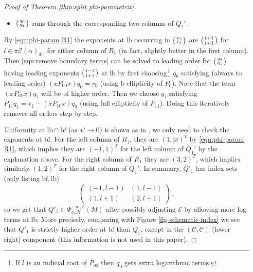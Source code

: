 \documentclass[JEP,XML,SOM,Unicode,NoFloatCountersInSection,published]{cedram}
\newenvironment{smallpmatrix}{\big(\begin{smallmatrix}}{\end{smallmatrix}\big)}
\theoremstyle{plain}
\theoremstyle{definition}
\newcommand\calE{{\mathcal E}}
\newcommand{\lf}{{\mathrm{lb}}}
\newcommand{\bbf}{{\mathrm{bf}}}
\begin{document}
\begin{proof}[Proof of Theorem \ref{thm:split phi-parametrix}]
\begin{itemize}
\item $\begin{smallpmatrix} q_0 \\ q_1 \end{smallpmatrix}$ runs through the corresponding two columns of $Q_1'$.
\end{itemize}
By \eqref{eqn:phi-param R1} the exponents at $\lf$ occurring in $\begin{smallpmatrix}
r_0 \\
r_1
\end{smallpmatrix}
$ are $\begin{smallpmatrix}
l+1 \\
l+1
\end{smallpmatrix}
$
for $l\in\pi\calE(\alpha)_\lf$, for either column of $R_1$ (in fact, slightly better in the first column). Then \eqref{eqn:remove boundary terms}
can be solved to leading order for $\begin{smallpmatrix}
q_0 \\
q_1
\end{smallpmatrix}
$ having leading exponents
$\begin{smallpmatrix}
l-1 \\
l+1
\end{smallpmatrix}
$
at $\lf$
by first choosing\footnote{If $l$ is an indicial root of $P_{00}$ then $q_0$ gets extra logarithmic terms.}~$q_0$ satisfying (always to leading order) $(xP_{00}x)q_0=r_0$ (using b-ellipticity of $P_{0}$).
Note that the term $(xP_{01}x)q_1$ will be of higher order. Then we choose $q_1$ satisfying
$P_{11} q_1 = r_1 - (xP_{10}x)q_0$ (using full ellipticity of $P_{11}$).
Doing this iteratively removes all orders step by step.

Uniformity at $\lf\cap\bbf$ (as $x'\to 0$) is shown as in \cite[Lem.\,5.44]{melrose1993atiyah}, we only need to check the exponents at $\bbf$. For the left column of $R_1$, they are $(1,\varnothing)^T$ by \eqref{eqn:phi-param R1}, which implies they are $(-1,1)^T$ for the left column of $Q_1'$ by the explanation above. For the right column of $R_1$ they are $(3,2)^T$, which implies similarly $(1,2)^T$ for the right column of $Q_1'$. In summary, $Q'_1$ has index sets (only listing $\bbf,\lf$)
\[
\begin{pmatrix}
(-1,l-1) & (1,l-1) \\
(1,l+1) & (2,l+1)
\end{pmatrix},
\]
so we get
that $Q'_1\in\Psi^{-\infty,\calE}_{\phi, \mathscr{H}}(M)$ after possibly adjusting $\calE$ by allowing more log terms at $\lf$.
More precisely, comparing with Figure \ref{fig-schematic-index} we see that
$Q'_1$ is strictly higher order at $\bbf$ than $Q_1$, except in the $(\mathscr{C},\mathscr{C})$ (lower right) component
(this information is not used in this paper).


\end{proof}
\end{document}
